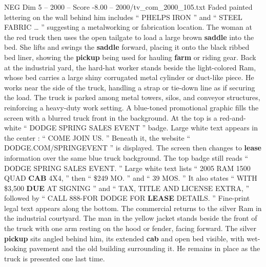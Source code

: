 \begin{textsample}{NEG Dim 5 – 2000 – Score -8.00 – 2000/tv\_com\_2000\_105.txt}
Faded painted lettering on the wall behind him includes “ PHELPS IRON ” and “ STEEL FABRIC … ” suggesting a metalworking or fabrication location.
The woman at the red truck then uses the open tailgate to load a large brown \textbf{saddle} into the bed.
She lifts and swings the \textbf{saddle} forward, placing it onto the black ribbed bed liner, showing the \textbf{pickup} being used for hauling \textbf{farm} or riding gear.
Back at the industrial yard, the hard-hat worker stands beside the light-colored Ram, whose bed carries a large shiny corrugated metal cylinder or duct-like piece.
He works near the side of the truck, handling a strap or tie-down line as if securing the load.
The truck is parked among metal towers, silos, and conveyor structures, reinforcing a heavy-duty work setting.
A blue-toned promotional graphic fills the screen with a blurred truck front in the background.
At the top is a red-and-white “ DODGE SPRING SALES EVENT ” badge.
Large white text appears in the center : “ COME JOIN US. ” Beneath it, the website “ DODGE.COM/SPRINGEVENT ” is displayed.
The screen then changes to \textbf{lease} information over the same blue truck background.
The top badge still reads “ DODGE SPRING SALES EVENT. ” Large white text lists “ 2005 RAM 1500 QUAD \textbf{CAB} 4X4, ” then “ \$249 MO. ” and “ 39 MOS. ” It also states “ WITH \$3,500 \textbf{DUE} AT SIGNING ” and “ TAX, TITLE AND LICENSE EXTRA, ” followed by “ CALL 888-FOR DODGE FOR \textbf{LEASE} DETAILS. ” Fine-print legal text appears along the bottom.
The commercial returns to the silver Ram in the industrial courtyard.
The man in the yellow jacket stands beside the front of the truck with one arm resting on the hood or fender, facing forward.
The silver \textbf{pickup} sits angled behind him, its extended \textbf{cab} and open bed visible, with wet-looking pavement and the old building surrounding it.
He remains in place as the truck is presented one last time.

\end{textsample}
